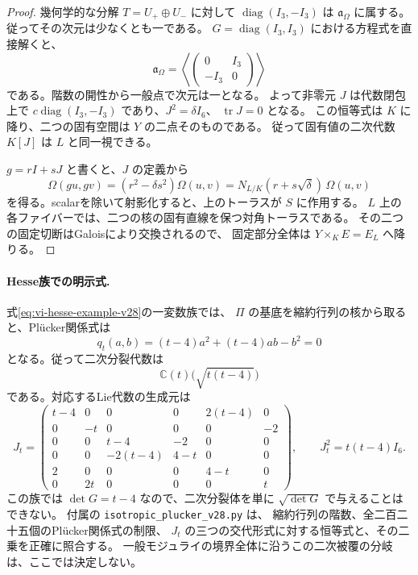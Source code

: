 \begin{proof}
幾何学的な分解 $T=U_+\oplus U_-$ に対して
$\operatorname{diag}(I_3,-I_3)$ は $\mathfrak a_\Omega$ に属する。
従ってその次元は少なくとも一である。
$G=\operatorname{diag}(I_3,I_3)$ における方程式を直接解くと、
\[
 \mathfrak a_\Omega=
 \left\langle\begin{pmatrix}0&I_3\\-I_3&0\end{pmatrix}\right\rangle
\]
である。階数の開性から一般点で次元は一となる。
よって非零元 $J$ は代数閉包上で
$c\operatorname{diag}(I_3,-I_3)$ であり、$J^2=\delta I_6$、
$\operatorname{tr}J=0$ となる。
この恒等式は $K$ に降り、二つの固有空間は $Y$ の二点そのものである。
従って固有値の二次代数 $K[J]$ は $L$ と同一視できる。

$g=rI+sJ$ と書くと、$J$ の定義から
\[
 \Omega(gu,gv)=(r^2-\delta s^2)\Omega(u,v)
       =N_{L/K}(r+s\sqrt\delta)\,\Omega(u,v)
\]
を得る。scalarを除いて射影化すると、上のトーラスが $S$ に作用する。
$L$ 上の各ファイバーでは、二つの核の固有直線を保つ対角トーラスである。
その二つの固定切断はGaloisにより交換されるので、
固定部分全体は $Y\times_KE=E_L$ へ降りる。
\end{proof}

\paragraph{Hesse族での明示式.}
式\eqref{eq:vi-hesse-example-v28}の一変数族では、
$\Pi$ の基底を縮約行列の核から取ると、Pl\"ucker関係式は
\[
 q_t(a,b)=(t-4)a^2+(t-4)ab-b^2=0
\]
となる。従って二次分裂代数は
\[
 \mathbb C(t)\bigl(\sqrt{t(t-4)}\bigr)
\]
である。対応するLie代数の生成元は
\[
 J_t=\begin{pmatrix}
 t-4&0&0&0&2(t-4)&0\\
 0&-t&0&0&0&-2\\
 0&0&t-4&-2&0&0\\
 0&0&-2(t-4)&4-t&0&0\\
 2&0&0&0&4-t&0\\
 0&2t&0&0&0&t
 \end{pmatrix},
 \qquad J_t^2=t(t-4)I_6.
\]
この族では $\det G=t-4$ なので、二次分裂体を単に
$\sqrt{\det G}$ で与えることはできない。
付属の \nolinkurl{isotropic_plucker_v28.py} は、
縮約行列の階数、全二百二十五個のPl\"ucker関係式の制限、
$J_t$ の三つの交代形式に対する恒等式と、その二乗を正確に照合する。
一般モジュライの境界全体に沿うこの二次被覆の分岐は、ここでは決定しない。
